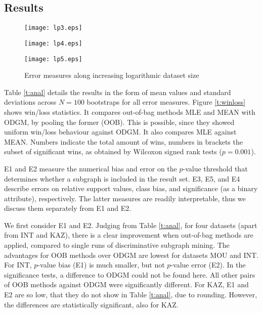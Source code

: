 \documentclass{sig-alternate}
\begin{document}
\subsection{Results}

\label{ss:Results}
\begin{figure*}[t]
  \begin{minipage}[h]{5.5cm}
    \texttt{[image: lp3.eps]}
  \end{minipage}
  \begin{minipage}[h]{5.5cm}
    \texttt{[image: lp4.eps]}
  \end{minipage}
  \begin{minipage}[h]{5.5cm}
    \texttt{[image: lp5.eps]}
  \end{minipage}
  \caption{Error measures along increasing logarithmic dataset size}
  \label{fig:lp}
\end{figure*}
Table \ref{t:anal} details the results in the form of mean values and standard
deviations across $N=100$ bootstraps for all error measures.  
Figure
\ref{t:winloss} shows win/loss statistics. It compares out-of-bag methods MLE
and MEAN with ODGM, by pooling the former (OOB). This is possible, since they
showed uniform win/loss behaviour against ODGM.
It also compares MLE against MEAN.
Numbers indicate the total amount of wins, numbers in brackets the
subset of significant wins, as obtained by Wilcoxon signed rank tests ($p=0.001$).

E1 and E2 measure the numerical bias and error on the $p$-value threshold that determines whether
a subgraph is included in the result set.  E3, E5, and E4 describe errors on
relative support values, class bias, and significance (as a binary attribute),
respectively.  The latter measures are readily interpretable, thus we discuss
them separately from E1 and E2.

We first consider E1 and E2. Judging from Table \ref{t:anal}, for four datasets
(apart from INT and KAZ), there is a clear improvement when out-of-bag
methods are applied, compared to single runs of discriminative
subgraph mining. The advantages for OOB methods over ODGM are lowest for datasets MOU and INT.
For INT, $p$-value bias (E1)
is much smaller, but not $p$-value error (E2). In the significance
tests, a difference to ODGM could not be found here. All other pairs of OOB 
methods against ODGM were significantly different. For KAZ, E1 and
E2 are so low, that they do not show in Table \ref{t:anal}, due to rounding. However,
the differences are statistically significant, also for KAZ.
\end{document}
